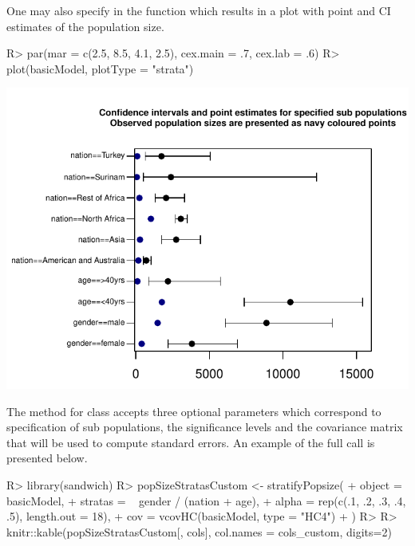 \documentclass[
]{jss}
\newcommand{\1}{\mathcal{I}} \newcommand{\bZero}{\boldsymbol{0}}
\begin{document}
One may also specify  in the 
function which results in a plot with point and CI estimates of the
population size.

\begin{CodeChunk}
\begin{CodeInput}
R> par(mar = c(2.5, 8.5, 4.1, 2.5), cex.main = .7, cex.lab = .6)
R> plot(basicModel, plotType = "strata")
\end{CodeInput}


\begin{center}\includegraphics{singleRcapture_files/figure-latex/strata_plot-1} \end{center}

\end{CodeChunk}

The method for  class accepts three
optional parameters  which correspond to
specification of sub populations, the significance levels and the
covariance matrix that will be used to compute standard errors. An
example of the full call is presented below.

\begin{CodeInput}
R> library(sandwich)
R> popSizeStratasCustom <- stratifyPopsize(
+   object  = basicModel,
+   stratas = ~ gender / (nation + age), 
+   alpha   = rep(c(.1, .2, .3, .4, .5), length.out = 18),
+   cov     = vcovHC(basicModel, type = "HC4")
+ )
R> 
R> knitr::kable(popSizeStratasCustom[, cols], col.names = cols_custom, digits=2)
\end{CodeInput}
\end{document}
